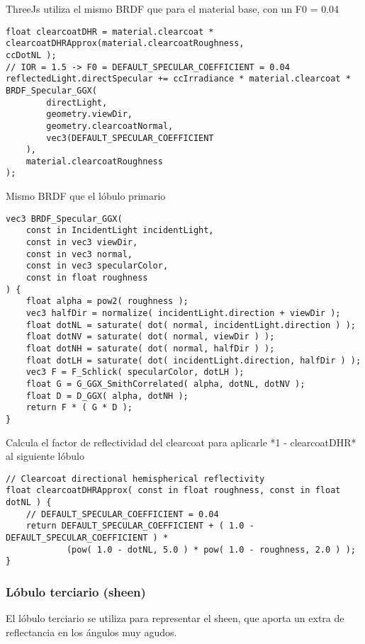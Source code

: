             ThreeJs utiliza el mismo BRDF que para el material base, con un F0 = 0.04
            \singlespacing
            \begin{lstlisting}[caption=My Javascript Example]
float clearcoatDHR = material.clearcoat * clearcoatDHRApprox(material.clearcoatRoughness,                      ccDotNL );
// IOR = 1.5 -> F0 = DEFAULT_SPECULAR_COEFFICIENT = 0.04
reflectedLight.directSpecular += ccIrradiance * material.clearcoat * BRDF_Specular_GGX(
        directLight,
        geometry.viewDir,
        geometry.clearcoatNormal,
        vec3(DEFAULT_SPECULAR_COEFFICIENT
    ),
    material.clearcoatRoughness
);
            \end{lstlisting}
            \singlespacing
            Mismo BRDF que el lóbulo primario
            \singlespacing
            \begin{lstlisting}[caption=My Javascript Example]
vec3 BRDF_Specular_GGX(
    const in IncidentLight incidentLight,
    const in vec3 viewDir,
    const in vec3 normal,
    const in vec3 specularColor,
    const in float roughness
) {
    float alpha = pow2( roughness );
    vec3 halfDir = normalize( incidentLight.direction + viewDir );
    float dotNL = saturate( dot( normal, incidentLight.direction ) );
    float dotNV = saturate( dot( normal, viewDir ) );
    float dotNH = saturate( dot( normal, halfDir ) );
    float dotLH = saturate( dot( incidentLight.direction, halfDir ) );
    vec3 F = F_Schlick( specularColor, dotLH );
    float G = G_GGX_SmithCorrelated( alpha, dotNL, dotNV );
    float D = D_GGX( alpha, dotNH );
    return F * ( G * D );
}
            \end{lstlisting}
            \singlespacing
            Calcula el factor de reflectividad del clearcoat para aplicarle *1 - clearcoatDHR* al
            siguiente lóbulo
            \singlespacing
            \begin{lstlisting}[caption=My Javascript Example]
// Clearcoat directional hemispherical reflectivity
float clearcoatDHRApprox( const in float roughness, const in float dotNL ) {
    // DEFAULT_SPECULAR_COEFFICIENT = 0.04
    return DEFAULT_SPECULAR_COEFFICIENT + ( 1.0 - DEFAULT_SPECULAR_COEFFICIENT ) *
            (pow( 1.0 - dotNL, 5.0 ) * pow( 1.0 - roughness, 2.0 ) );
}
            \end{lstlisting}
            \singlespacing

        \subsubsection{L\'obulo terciario (sheen)}
            El l\'obulo terciario se utiliza para representar el sheen, que aporta un extra de
            reflectancia en los \'angulos muy agudos.

